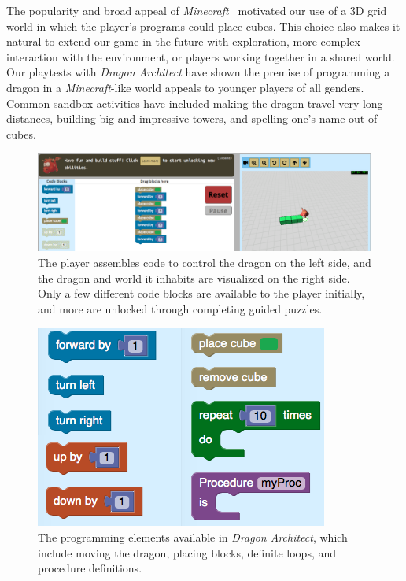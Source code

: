 \documentclass{sig-alternate}
\newcommand{\gametitle}{{\emph{Dragon Architect}}}
\begin{document}
The popularity and broad appeal of \emph{Minecraft}~\cite{minecraft} motivated our use of a 3D grid world in which the player's programs could place cubes.
This choice also makes it natural to extend our game in the future with exploration, more complex interaction with the environment, or players working together in a shared world.
Our playtests with \emph{Dragon Architect} have shown the premise of programming a dragon in a \emph{Minecraft}-like world appeals to younger players of all genders.
Common sandbox activities have included making the dragon travel very long distances, building big and impressive towers, and spelling one's name out of cubes.

\begin{figure}[t!]
  \centering
  \includegraphics[width=\textwidth]{images/overall-example-cropped}
  \caption{The player assembles code to control the dragon on the left side, and the dragon and world it inhabits are visualized on the right side. Only a few different code blocks are available to the player initially, and more are unlocked through completing guided puzzles.}
  \label{fig:overall}
\end{figure}

\begin{figure}[htb]
  \centering
  \includegraphics[width=\columnwidth]{images/toolbox-wide}
  \caption{The programming elements available in \gametitle{}, which include moving the dragon, placing blocks, definite loops, and procedure definitions.}
  \label{fig:toolbox}
\end{figure}
\end{document}
